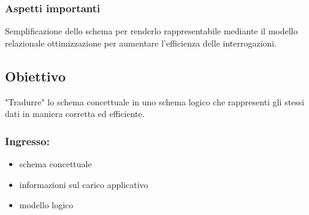 \subsubsection{Aspetti importanti}
Semplificazione dello schema per renderlo rappresentabile mediante il modello relazionale ottimizzazione per aumentare l'efficienza delle interrogazioni.

\subsection{Obiettivo}
"Tradurre" lo schema concettuale in uno schema logico che rappresenti gli stessi dati in maniera corretta ed efficiente.

\subsubsection{Ingresso:}
\begin{itemize}
    \item schema concettuale
    \item informazioni sul carico applicativo
    \item modello logico
\end{itemize}
